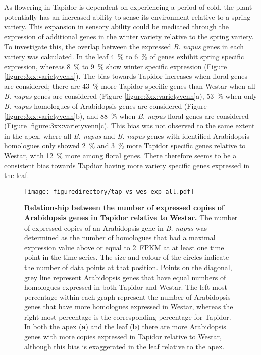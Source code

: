 \documentclass[12pt,]{book}
\begin{document}
As flowering in Tapidor is dependent on experiencing a period of cold,
the plant potentially has an increased ability to sense its environment
relative to a spring variety. This expansion in sensory ability could be
mediated through the expression of additional genes in the winter
variety relative to the spring variety. To investigate this, the overlap
between the expressed \emph{B. napus} genes in each variety was
calculated. In the leaf 4~\% to 6~\% of genes exhibit spring specific
expression, whereas 8~\% to 9~\% show winter specific expression (Figure
\ref{figure:3xx:varietyvenn}). The bias towards Tapidor increases when
floral genes are considered; there are 43~\% more Tapidor specific genes
than Westar when all \emph{B. napus} genes are considered (Figure
\ref{figure:3xx:varietyvenn}a), 53~\% when only \emph{B. napus}
homologues of Arabidopsis genes are considered (Figure
\ref{figure:3xx:varietyvenn}b), and 88~\% when \emph{B. napus} floral
genes are considered (Figure \ref{figure:3xx:varietyvenn}c). This bias
was not observed to the same extent in the apex, where all \emph{B.
napus} and \emph{B. napus} genes with identified Arabidopsis homologues
only showed 2~\% and 3~\% more Tapidor specific genes relative to
Westar, with 12~\% more among floral genes. There therefore seems to be
a consistent bias towards Tapdior having more variety specific genes
expressed in the leaf.

\begin{figure}[htbp]
\centering
\texttt{[image: figuredirectory/tap\_vs\_wes\_exp\_all.pdf]}
\caption{\textbf{Relationship between the number of expressed copies of
Arabidopsis genes in Tapidor relative to Westar.} The number of
expressed copies of an Arabidopsis gene in \emph{B. napus} was
determined as the number of homologues that had a maximal expression
value above or equal to 2~FPKM at at least one time point in the time
series. The size and colour of the circles indicate the number of data
points at that position. Points on the diagonal, grey line represent
Arabidopsis genes that have equal numbers of homologues expressed in
both Tapidor and Westar. The left most percentage within each graph
represent the number of Arabidopsis genes that have more homologues
expressed in Westar, whereas the right most percentage is the
corresponding percentage for Tapidor. In both the apex (\textbf{a}) and
the leaf (\textbf{b}) there are more Arabidopsis genes with more copies
expressed in Tapidor relative to Westar, although this bias is
exaggerated in the leaf relative to the
apex.}\label{figure:3xx:tapvswesall}
\end{figure}
\end{document}
